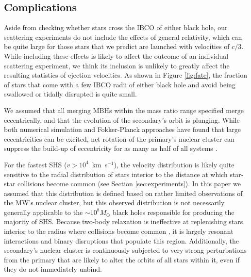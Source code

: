 \documentclass[a4paper,twocolumn]{emulateapj}
\begin{document}
{\subsection{Complications}
Aside from checking whether stars cross the IBCO of either black hole, our scattering experiments do not include the effects of general relativity, which can be quite large for those stars that we predict are launched with velocities of $c/3$. While including these effects is likely to affect the outcome of an individual scattering experiment, we think its inclusion is unlikely to greatly affect the resulting statistics of ejection velocities. As shown in Figure \ref{fig:fate}, the fraction of stars that come with a few IBCO radii of either black hole and avoid being swallowed or tidally disrupted is quite small.

We assumed that all merging MBHs within the mass ratio range specified merge eccentrically, and that the evolution of the secondary's orbit is plunging. While both numerical simulation and Fokker-Planck approaches have found that large eccentricities can be excited, net rotation of the primary's nuclear cluster can suppress the build-up of eccentricity for as many as half of all systems \citep{Sesana:2011a,Dotti:2012a}.

For the fastest SHS ($v > 10^{4}$~km~s$^{-1}$), the velocity distribution is likely quite sensitive to the radial distribution of stars interior to the distance at which star-star collisions become common (see Section \ref{sec:experiments}). In this paper we assumed that this distribution is defined based on rather limited observations of the MW's nuclear cluster, but this observed distribution is not necessarily generally applicable to the $\sim 10^{8} M_{\odot}$ black holes responsible for producing the majority of SHS. Because two-body relaxation is ineffective at replenishing stars interior to the radius where collisions become common \citep[The results of which would produce luminous transients, see][]{Balberg:2013a}, it is largely resonant interactions \citep{Hamers:2014a} and binary disruptions \citep{Perets:2009b} that populate this region. Additionally, the secondary's nuclear cluster is continuously subjected to very strong perturbations from the primary that are likely to alter the orbits of all stars within it, even if they do not immediately unbind.

}
\end{document}

